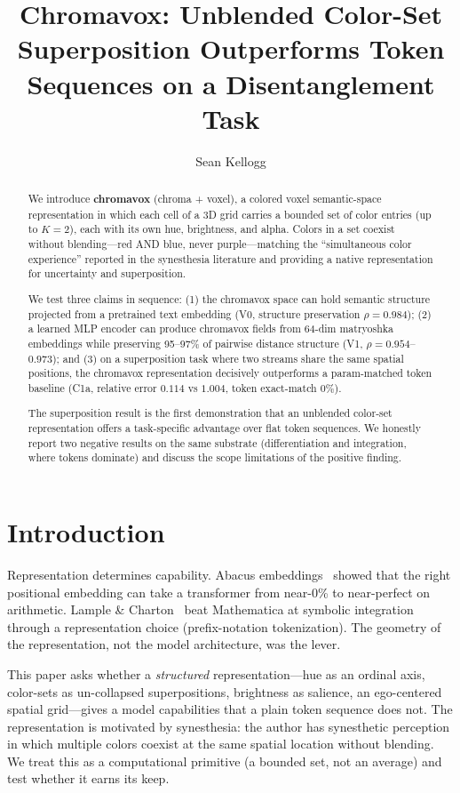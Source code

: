 \documentclass[11pt,a4paper]{article}
\title{Chromavox: Unblended Color-Set Superposition Outperforms Token Sequences on a Disentanglement Task}
\author{Sean Kellogg}
\date{}
\begin{document}
\maketitle

\begin{abstract}
We introduce \textbf{chromavox} (chroma + voxel), a colored voxel semantic-space representation in which each cell of a 3D grid carries a bounded set of color entries (up to $K{=}2$), each with its own hue, brightness, and alpha. Colors in a set coexist without blending---red AND blue, never purple---matching the ``simultaneous color experience'' reported in the synesthesia literature and providing a native representation for uncertainty and superposition.

We test three claims in sequence: (1) the chromavox space can hold semantic structure projected from a pretrained text embedding (V0, structure preservation $\rho{=}0.984$); (2) a learned MLP encoder can produce chromavox fields from 64-dim matryoshka embeddings while preserving 95--97\% of pairwise distance structure (V1, $\rho{=}0.954$--$0.973$); and (3) on a superposition task where two streams share the same spatial positions, the chromavox representation decisively outperforms a param-matched token baseline (C1a, relative error $0.114$ vs $1.004$, token exact-match $0\%$).

The superposition result is the first demonstration that an unblended color-set representation offers a task-specific advantage over flat token sequences. We honestly report two negative results on the same substrate (differentiation and integration, where tokens dominate) and discuss the scope limitations of the positive finding.
\end{abstract}

\section{Introduction}

Representation determines capability. Abacus embeddings~\cite{abacus} showed that the right positional embedding can take a transformer from near-0\% to near-perfect on arithmetic. Lample \& Charton~\cite{lample2020} beat Mathematica at symbolic integration through a representation choice (prefix-notation tokenization). The geometry of the representation, not the model architecture, was the lever.

This paper asks whether a \textit{structured} representation---hue as an ordinal axis, color-sets as un-collapsed superpositions, brightness as salience, an ego-centered spatial grid---gives a model capabilities that a plain token sequence does not. The representation is motivated by synesthesia: the author has synesthetic perception in which multiple colors coexist at the same spatial location without blending. We treat this as a computational primitive (a bounded set, not an average) and test whether it earns its keep.
\end{document}
